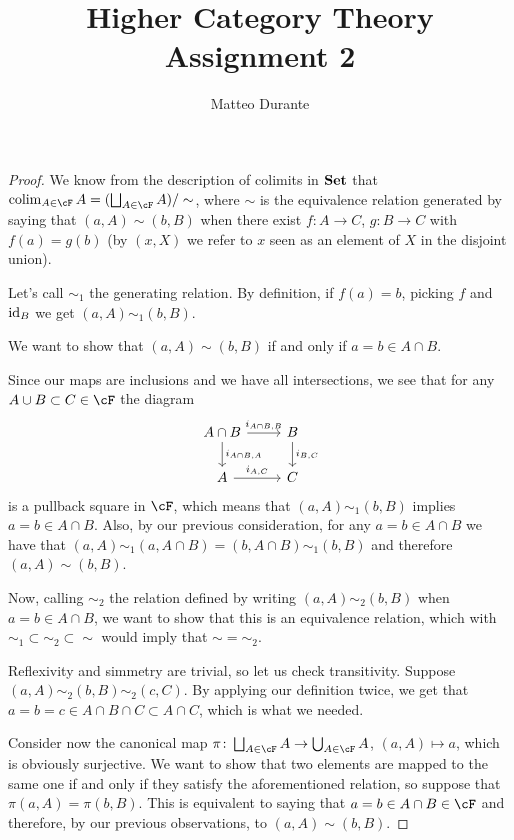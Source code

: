 \documentclass[a4paper,11pt,openany]{scrartcl}
\begin{document}
\title{Higher Category Theory\\ Assignment 2}

\author{Matteo Durante}

\maketitle

\begin{proof}
    We know from the description of colimits in $\operatorname{\mathbf{Set}}$ that
    $\colim_{A\in\cF}A=(\bigsqcup_{A\in\cF}A)/\sim$, where $\sim$ is the
    equivalence relation generated by saying that $(a,A)\sim(b,B)$
    when there exist $f\colon A\rightarrow C$,
    $g\colon B\rightarrow C$ with $f(a)=g(b)$ (by $(x,X)$ we refer to
    $x$ seen as an element of $X$ in the disjoint union).

    Let's call $\sim_1$ the generating relation.
    By definition, if $f(a)=b$, picking $f$ and $\operatorname{id}_B$ we get $(a,A)\sim_1(b,B)$.

    We want to show that $(a,A)\sim(b,B)$ if and only if $a=b\in A\cap B$.

    Since our maps are inclusions and we have all intersections, we see that for
    any $A\cup B\subset C\in\cF$ the diagram
    \[
        \begin{tikzcd}
            A\cap B\ar[r, "i_{A\cap B,B}"]\ar[d, "i_{A\cap B,A}"]
            & B\ar[d, "i_{B,C}"] \\
            A\ar[r, "i_{A,C}"]
            & C
        \end{tikzcd}
    \]
    is a pullback square in $\cF$, which means that
    $(a,A)\sim_1(b,B)$ implies $a=b\in A\cap B$. Also, by our previous
    consideration, for any $a=b\in A\cap B$ we have that $(a,A)\sim_1(a,A\cap
    B)=(b,A\cap B)\sim_1(b,B)$ and therefore $(a,A)\sim(b,B)$.

    Now, calling $\sim_2$ the relation defined by writing
    $(a,A)\sim_2(b,B)$ when $a=b\in A\cap B$, we want to show that this is an
    equivalence relation, which with $\sim_1\subset\sim_2\subset\sim$ would
    imply that $\sim=\sim_2$.

    Reflexivity and simmetry are trivial, so let us check transitivity. Suppose
    $(a,A)\sim_2(b,B)\sim_2(c,C)$. By applying our definition twice, we get that
    $a=b=c\in A\cap B\cap C\subset A\cap C$, which is what we needed.

    Consider now the canonical map
    $\pi\colon\bigsqcup_{A\in\cF}A\rightarrow\bigcup_{A\in\cF}A$, $(a,A)\mapsto
    a$, which is
    obviously surjective. We want to show that two
    elements are mapped to the same one if and only if they satisfy the
    aforementioned relation, so suppose that $\pi(a,A)=\pi(b,B)$.
    This is equivalent to saying that $a=b\in A\cap B\in\cF$ and therefore, by our previous
    observations, to $(a,A)\sim(b,B)$.
\end{proof}
\end{document}
